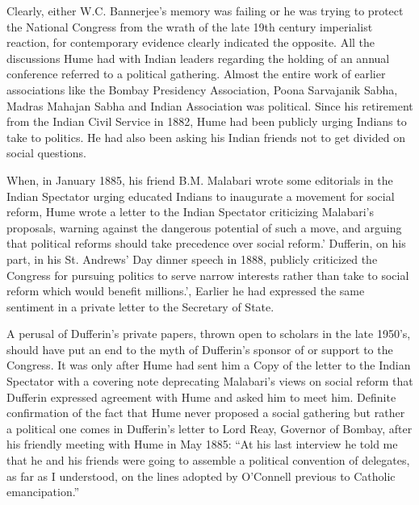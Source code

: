 \begin{multicols}{2}
Clearly, either W.C. Bannerjee's memory was failing or he was trying to protect the National Congress from the wrath of the late 19th century imperialist reaction, for contemporary evidence clearly indicated the opposite. All the discussions Hume had with Indian leaders regarding the holding of an annual conference referred to a political gathering. Almost the entire work of earlier associations like the Bombay Presidency Association, Poona Sarvajanik Sabha, Madras Mahajan Sabha and Indian Association was political. Since his retirement from the Indian Civil Service in 1882, Hume had been publicly urging Indians to take to politics. He had also been asking his Indian friends not to get divided on social questions.

When, in January 1885, his friend B.M. Malabari wrote some editorials in the Indian Spectator urging educated Indians to inaugurate a movement for social reform, Hume wrote a letter to the Indian Spectator criticizing Malabari's proposals, warning against the dangerous potential of such a move, and arguing that political reforms should take precedence over social reform.' Dufferin, on his part, in his St. Andrews' Day dinner speech in 1888, publicly criticized the Congress for pursuing politics to serve narrow interests rather than take to social reform which would benefit millions.', Earlier he had expressed the same sentiment in a private letter to the Secretary of State.

A perusal of Dufferin's private papers, thrown open to scholars in the late 1950's, should have put an end to the myth of Dufferin's sponsor of or support to the Congress. It was only after Hume had sent him a Copy of the letter to the Indian Spectator with a covering note deprecating Malabari's views on social reform that Dufferin expressed agreement with Hume and asked him to meet him. Definite confirmation of the fact that Hume never proposed a social gathering but rather a political one comes in Dufferin's letter to Lord Reay, Governor of Bombay, after his friendly meeting with Hume in May 1885: ``At his last interview he told me that he and his friends were going to assemble a political convention of delegates, as far as I understood, on the lines adopted by O'Connell previous to Catholic emancipation.''


\end{multicols}
